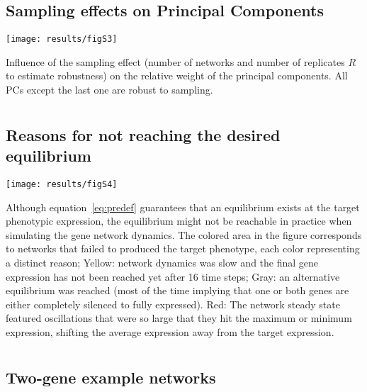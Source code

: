 \documentclass[10pt,a4paper]{article}
\begin{document}
\begin{appendices}
    \subsection*{Sampling effects on Principal Components}
    
	\begin{center}
	\texttt{[image: results/figS3]}
	\end{center}    

	{\color{Gray} Influence of the sampling effect (number of networks and number of replicates $R$ to estimate robustness) on the relative
	weight of the principal components. All PCs except the last one are robust to sampling. }


  \clearpage
  \section{}
    \label{supp:whyitfails}
    \subsection*{Reasons for not reaching the desired equilibrium}
	\begin{center}
	\texttt{[image: results/figS4]}
	\end{center}
	
	{\color{Gray} Although equation~\ref{eq:predef} guarantees that an equilibrium exists at the target phenotypic expression, the equilibrium might not be reachable in practice when simulating the gene network dynamics. The colored area in the figure corresponds to networks that failed to produced the target phenotype, each color representing a distinct reason; Yellow: network dynamics was slow and the final gene expression has not been reached yet after 16 time steps; Gray: an alternative equilibrium was reached (most of the time implying that one or both genes are either completely silenced to fully expressed). Red: The network steady state featured oscillations that were so large that they hit the maximum or minimum expression, shifting the average expression away from the target expression. }
	
	
  \clearpage
  \section{}
    \label{supp:W}
    \subsection*{Two-gene example networks}


\end{appendices}
\end{document}
